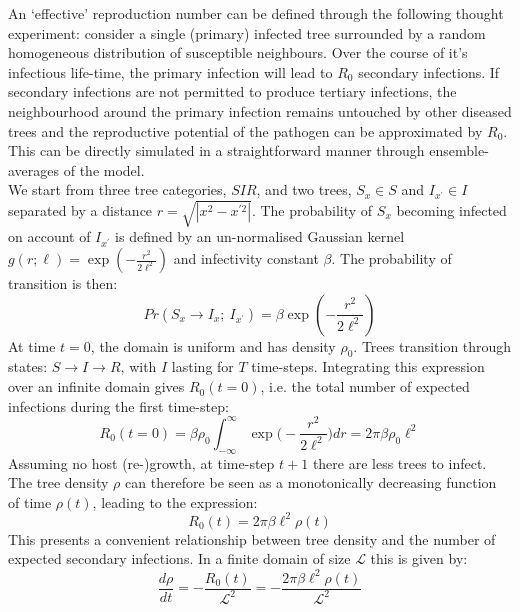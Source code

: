 An `effective' reproduction number can be defined through the following thought experiment: consider a single (primary) infected tree surrounded by a random homogeneous distribution of susceptible neighbours. Over the course of it's infectious life-time, the primary infection will lead to $R_0$ secondary infections. If secondary infections are not permitted to produce tertiary infections, the neighbourhood around the primary infection remains untouched by other diseased trees and the reproductive potential of the pathogen can be approximated by $R_0$. This can be directly simulated in a straightforward manner through ensemble-averages of the model.\\

\label{section:apendix_A}
We start from three tree categories, $SIR$, and two trees, $S_x\in S$ and $I_{x^\prime}\in I$ separated by a distance $r=\sqrt{|x^2-x^{\prime 2}|}$. The probability of $S_x$ becoming infected on account of $I_{x^\prime}$ is defined by an un-normalised Gaussian kernel $g(r; \ell) = \exp(-\frac{r^2}{2\ell^2})$ and infectivity constant $\beta$. The probability of transition is then:
\begin{equation}
\label{eq:Appendix_pr_trans}
     Pr(S_x\rightarrow I_x;\ I_{x^\prime}) = \beta \exp(-\frac{r^2}{2\ell^2})
\end{equation}
At time $t=0$, the domain is uniform and has density $\rho_0$. Trees transition through states: $S\rightarrow I\rightarrow R$, with $I$ lasting for $T$ time-steps. Integrating this expression over an infinite domain gives $R_0(t=0)$, i.e. the total number of expected infections during the first time-step:
\begin{equation}
    R_0(t = 0) = \beta \rho_0 \int^{\infty}_{-\infty} \exp\Big(-\frac{r^2}{2\ell^2}\Big)dr= 2\pi\beta\rho_0\ell^2
\end{equation}{} 
Assuming no host (re-)growth, at time-step $t+1$ there are less trees to infect. The tree density $\rho$ can therefore be seen as a monotonically decreasing function of time $\rho(t)$, leading to the expression:
\begin{equation}
    R_0(t) = 2\pi\beta\ell^2\rho(t)
    \label{eq:r0-A}
\end{equation}{}
This presents a convenient relationship between tree density and the number of expected secondary infections. In a finite domain of size $\mathcal{L}$ this is given by:
\begin{equation}
    \frac{d\rho}{dt} = - \frac{R_0(t)}{\mathcal{L}^2} = -\frac{2\pi\beta\ell^2\rho(t)}{\mathcal{L}^2}
\end{equation}
